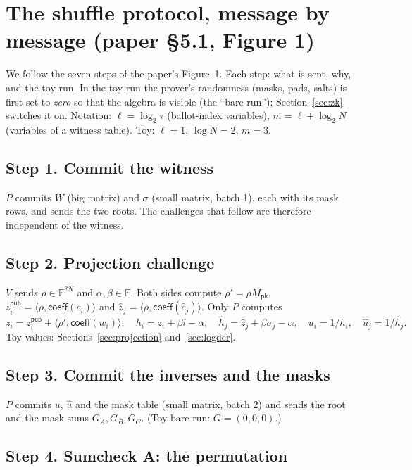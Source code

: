 \documentclass[11pt,a4paper]{article}
\newcommand{\F}{\mathbb{F}}
\newcommand{\coeff}{\mathsf{coeff}}
\newcommand{\Mpk}{M_{\mathsf{pk}}}
\newcommand{\ip}[2]{\langle #1, #2\rangle}
\newcommand{\uh}{\hat{u}}
\newcommand{\hh}{\hat{h}}
\newcommand{\zh}{\hat{z}}
\newcommand{\ch}{\hat{c}}
\newcommand{\zpub}{z^{\mathsf{pub}}}
\theoremstyle{definition}
\theoremstyle{plain}
\begin{document}
\section{The shuffle protocol, message by message (paper \S5.1, Figure 1)}
\label{sec:protocol}

We follow the seven steps of the paper's Figure~1. Each step: what is sent, why, and the toy run.
In the toy run the prover's randomness (masks, pads, salts) is first set to \emph{zero} so that the
algebra is visible (the ``bare run''); Section~\ref{sec:zk} switches it on. Notation: $\ell=\log_2\tau$
(ballot-index variables), $m=\ell+\log_2N$ (variables of a witness table). Toy: $\ell=1$, $\log N=2$, $m=3$.

\subsection*{Step 1. Commit the witness}
$P$ commits $W$ (big matrix) and $\sigma$ (small matrix, batch 1), each with its mask rows, and sends the
two roots. The challenges that follow are therefore independent of the witness.

\subsection*{Step 2. Projection challenge}
$V$ sends $\rho\in\F^{2N}$ and $\alpha,\beta\in\F$. Both sides compute $\rho'=\rho\Mpk$,
$\zpub_i=\ip{\rho}{\coeff(c_i)}$ and $\zh_j=\ip{\rho}{\coeff(\ch_j)}$. Only $P$ computes
\[
  z_i=\zpub_i+\ip{\rho'}{\coeff(w_i)},\quad h_i=z_i+\beta i-\alpha,\quad \hh_j=\zh_j+\beta\sigma_j-\alpha,\quad
  u_i=1/h_i,\quad \uh_j=1/\hh_j .
\]
Toy values: Sections~\ref{sec:projection} and~\ref{sec:logder}.

\subsection*{Step 3. Commit the inverses and the masks}
$P$ commits $u$, $\uh$ and the mask table (small matrix, batch 2) and sends the root and the mask sums
$G_A,G_B,G_C$. (Toy bare run: $G=(0,0,0)$.)

\subsection*{Step 4. Sumcheck A: the permutation}
\end{document}
